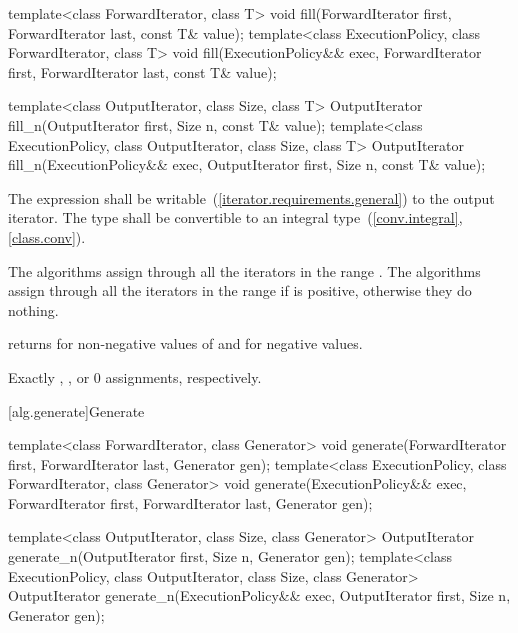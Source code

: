 %
%
\begin{itemdecl}
template<class ForwardIterator, class T>
  void fill(ForwardIterator first, ForwardIterator last, const T& value);
template<class ExecutionPolicy, class ForwardIterator, class T>
  void fill(ExecutionPolicy&& exec,
            ForwardIterator first, ForwardIterator last, const T& value);

template<class OutputIterator, class Size, class T>
  OutputIterator fill_n(OutputIterator first, Size n, const T& value);
template<class ExecutionPolicy, class OutputIterator, class Size, class T>
  OutputIterator fill_n(ExecutionPolicy&& exec,
                        OutputIterator first, Size n, const T& value);

\end{itemdecl}

\begin{itemdescr}
\pnum
\requires
The expression
shall be writable~(\ref{iterator.requirements.general}) to the output iterator. The type
shall be convertible to an integral type~(\ref{conv.integral}, \ref{class.conv}).

\pnum
\effects
The  algorithms assign  through all the iterators in the range
. The  algorithms assign 
through all the iterators in the range 
if  is positive, otherwise they do nothing.

\pnum
\returns {} returns  for non-negative values of 
and  for negative values.

\pnum
\complexity
Exactly
,
, or 0 assignments, respectively.
\end{itemdescr}

[alg.generate]{Generate}

%
%
\begin{itemdecl}
template<class ForwardIterator, class Generator>
  void generate(ForwardIterator first, ForwardIterator last,
                Generator gen);
template<class ExecutionPolicy, class ForwardIterator, class Generator>
  void generate(ExecutionPolicy&& exec,
                ForwardIterator first, ForwardIterator last,
                Generator gen);

template<class OutputIterator, class Size, class Generator>
  OutputIterator generate_n(OutputIterator first, Size n, Generator gen);
template<class ExecutionPolicy, class OutputIterator, class Size, class Generator>
  OutputIterator generate_n(ExecutionPolicy&& exec,
                            OutputIterator first, Size n, Generator gen);
\end{itemdecl}

